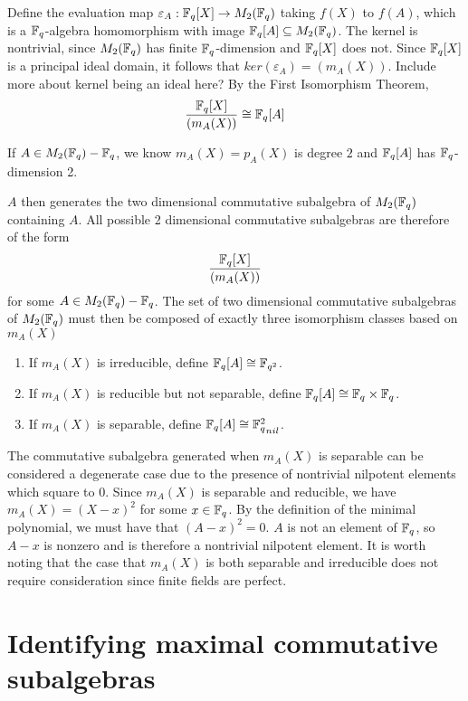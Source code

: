 \documentclass{amsart}
\begin{document}
    Define the evaluation map $\varepsilon_A : \protect\mathbb{F}_q[X] \rightarrow M_2(\protect\mathbb{F}_q)$ taking $f(X)$ to $f(A)$, which is a $\protect\mathbb{F}_q$-algebra homomorphism with image $\protect\mathbb{F}_q[A] \subseteq M_2(\protect\mathbb{F}_q)$. The kernel is nontrivial, since $M_2(\protect\mathbb{F}_q)$ has finite $\protect\mathbb{F}_q$-dimension and $\protect\mathbb{F}_q[X]$ does not. Since $\protect\mathbb{F}_q[X]$ is a principal ideal domain, it follows that $ker(\varepsilon_A) = (m_A(X))$.{\color{blue} Include more about kernel being an ideal here?} By the First Isomorphism Theorem,
    \begin{align*}
        \frac{\protect\mathbb{F}_q[X]}{(m_A(X))} \cong \protect\mathbb{F}_q[A]
    \end{align*}

    If $A \in M_2(\protect\mathbb{F}_q) - \protect\mathbb{F}_q$, we know $m_A(X) = p_A(X)$ is degree $2$ and $\protect\mathbb{F}_q[A]$ has $\protect\mathbb{F}_q$-dimension 2.

    $A$ then generates the two dimensional commutative subalgebra of $M_2(\protect\mathbb{F}_q)$ containing $A$. All possible 2 dimensional commutative subalgebras are therefore of the form
    \begin{align*}
        \frac{\protect\mathbb{F}_q[X]}{(m_A(X))}
    \end{align*}
    for some $A \in M_2(\protect\mathbb{F}_q) - \protect\mathbb{F}_q$. The set of two dimensional commutative subalgebras of $M_2(\protect\mathbb{F}_q)$ must then be composed of exactly three isomorphism classes based on $m_A(X)$
    \begin{enumerate}
        \item If $m_A(X)$ is irreducible, define $\protect\mathbb{F}_q[A] \cong \protect\mathbb{F}_{q^2}$.
        \item If $m_A(X)$ is reducible but not separable, define $\protect\mathbb{F}_q[A] \cong \protect\mathbb{F}_q \times \protect\mathbb{F}_q$.
        \item If $m_A(X)$ is separable, define $\bF_q[A] \cong {\bF_q^2}_{nil}$.
    \end{enumerate}
    The commutative subalgebra generated when $m_A(X)$ is separable can be considered a degenerate case due to the presence of nontrivial nilpotent elements which square to $0$. Since $m_A(X)$ is separable and reducible, we have $m_A(X) = (X - x)^2$ for some $x \in \protect\mathbb{F}_q$. By the definition of the minimal polynomial, we must have that $(A - x) ^ 2 = 0$. $A$ is not an element of $\protect\mathbb{F}_q$, so $A - x$ is nonzero and is therefore a nontrivial nilpotent element.
    It is worth noting that the case that $m_A(X)$ is both separable and irreducible does not require consideration since finite fields are perfect.
    

\section{Identifying maximal commutative subalgebras}
\end{document}
